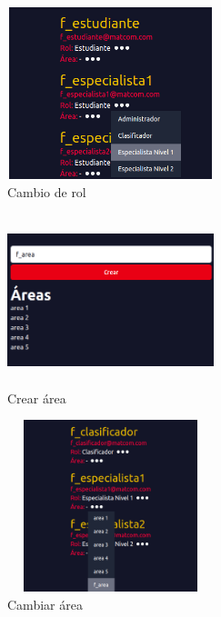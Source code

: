 	\begin{figure}[h]
	\begin{center}
		\includegraphics[width=6cm, height=5cm]{cambio_rol.png}
		\caption{Cambio de rol}
		\label{fig:f_cambio_rol}
		
	\end{center}
\end{figure}

	\begin{figure}[h]
	\begin{center}
		\includegraphics[width=6cm, height=5cm]{crear_area.png}
		\caption{Crear área}
		\label{fig:f_crear_ara}
		
	\end{center}
\end{figure}

	\begin{figure}[h]
	\begin{center}
		\includegraphics[width=6cm, height=5cm]{cambiar_area.png}
		\caption{Cambiar área}
		\label{fig:f_cambiar_area}
		
	\end{center}
\end{figure}

